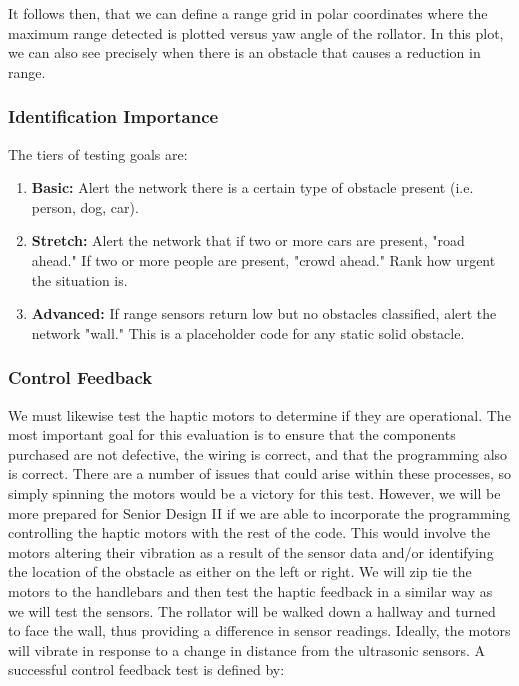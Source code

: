 
\noindent It follows then, that we can define a range grid in polar coordinates where the maximum range detected is plotted versus yaw angle of the rollator. In this plot, we can also see precisely when there is an obstacle that causes a reduction in range.\\

\subsubsection{Identification Importance}
The tiers of testing goals are:
\begin{enumerate}
	\item \textbf{Basic:} Alert the network there is a certain type of obstacle present (i.e. person, dog, car).
	\item \textbf{Stretch:} Alert the network that if two or more cars are present, "road ahead." If two or more people are present, "crowd ahead." Rank how urgent the situation is.
	\item \textbf{Advanced:} If range sensors return low but no obstacles classified, alert the network "wall." This is a placeholder code for any static solid obstacle.
\end{enumerate}

\subsubsection{Control Feedback}
\noindent We must likewise test the haptic motors to determine if they are operational. The most important goal for this evaluation is to ensure that the components purchased are not defective, the wiring is correct, and that the programming also is correct. There are a number of issues that could arise within these processes, so simply spinning the motors would be a victory for this test. However, we will be more prepared for Senior Design II if we are able to incorporate the programming controlling the haptic motors with the rest of the code. This would involve the motors altering their vibration as a result of the sensor data and/or identifying the location of the obstacle as either on the left or right. We will zip tie the motors to the handlebars and then test the haptic feedback in a similar way as we will test the sensors. The rollator will be walked down a hallway and turned to face the wall, thus providing a difference in sensor readings. Ideally, the motors will vibrate in response to a change in distance from the ultrasonic sensors. A successful control feedback test is defined by:


